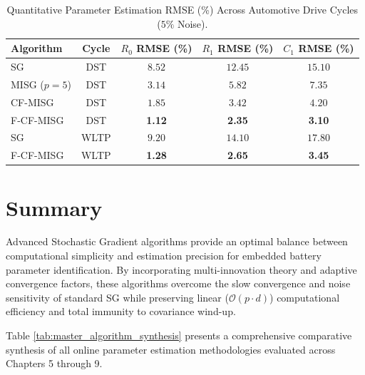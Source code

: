 \begin{table}[h!]
\centering
\small
\renewcommand{\arraystretch}{1.15}
\caption{Quantitative Parameter Estimation RMSE (\%) Across Automotive Drive Cycles ($5\%$ Noise).}
\label{tab:driving_cycle_performance}
\begin{tabular}{|l|c|c|c|c|}
\hline
\textbf{Algorithm} & \textbf{Cycle} & \textbf{$R_0$ RMSE (\%)} & \textbf{$R_1$ RMSE (\%)} & \textbf{$C_1$ RMSE (\%)} \\ \hline
SG & DST & $8.52$ & $12.45$ & $15.10$ \\ \hline
MISG ($p=5$) & DST & $3.14$ & $5.82$ & $7.35$ \\ \hline
CF-MISG & DST & $1.85$ & $3.42$ & $4.20$ \\ \hline
F-CF-MISG & DST & \textbf{1.12} & \textbf{2.35} & \textbf{3.10} \\ \hline \hline
SG & WLTP & $9.20$ & $14.10$ & $17.80$ \\ \hline
F-CF-MISG & WLTP & \textbf{1.28} & \textbf{2.65} & \textbf{3.45} \\ \hline
\end{tabular}
\end{table}


\section{Summary}
\label{sec:sg_summary}

Advanced Stochastic Gradient algorithms provide an optimal balance between computational simplicity and estimation precision for embedded battery parameter identification. By incorporating multi-innovation theory and adaptive convergence factors, these algorithms overcome the slow convergence and noise sensitivity of standard SG while preserving linear ($\mathcal{O}(p \cdot d)$) computational efficiency and total immunity to covariance wind-up.

Table \ref{tab:master_algorithm_synthesis} presents a comprehensive comparative synthesis of all online parameter estimation methodologies evaluated across Chapters 5 through 9.

